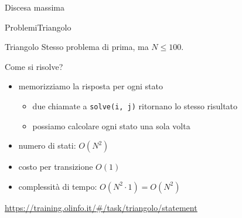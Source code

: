 \documentclass{beamer}
\begin{document}
\begin{frame}{Discesa massima}{}
\end{frame}

\begin{frame}{Problemi}{Triangolo}
    \begin{exampleblock}{Triangolo}
        Stesso problema di prima, ma $N \leq 100$.
    \end{exampleblock}
    \pause
    Come si risolve?
    \pause
    \begin{itemize}
        \item memorizziamo la risposta per ogni stato
            \pause
            \begin{itemize}
                \item due chiamate a \texttt{solve(i, j)} ritornano lo stesso risultato
                \item possiamo calcolare ogni stato una sola volta
            \end{itemize}
        \item numero di stati: $O(N^2)$
        \item costo per transizione $O(1)$
        \item complessit\`a di tempo: $O(N^2 \cdot 1) = O(N^2)$
    \end{itemize}
    \small{\underline{\url{https://training.olinfo.it/\#/task/triangolo/statement}}}
\end{frame}
\end{document}
